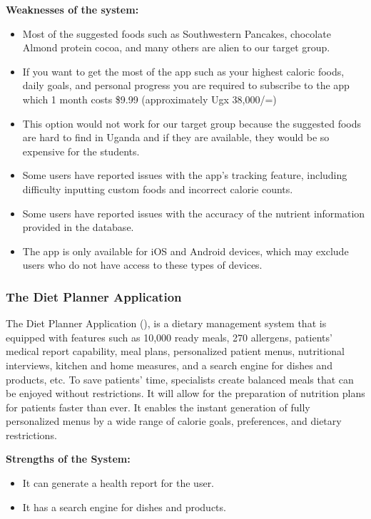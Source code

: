 \documentclass{article}
\begin{document}
\textbf{Weaknesses of the system:}
\begin{itemize}
\item Most of the suggested foods such as Southwestern Pancakes, chocolate Almond protein cocoa, and many others are alien to our target group.
\item If you want to get the most of the app such as your highest caloric foods, daily goals, and personal progress you are required to subscribe to the app which 1 month costs \$9.99 (approximately Ugx 38,000/=)
\item This option would not work for our target group because the suggested foods are hard to find in Uganda and if they are available, they would be so expensive for the students.

\item Some users have reported issues with the app's tracking feature, including difficulty inputting custom foods and incorrect calorie counts.
\item Some users have reported issues with the accuracy of the nutrient information provided in the database.
\item The app is only available for iOS and Android devices, which may exclude users who do not have access to these types of devices.

\end{itemize}

\subsubsection{The Diet Planner Application}

The Diet Planner Application (\cite{dietplannerapp}), is a dietary management system that is equipped with features such as 10,000 ready meals, 270 allergens, patients' medical report capability, meal plans, personalized patient menus, nutritional interviews, kitchen and home measures, and a search engine for dishes and products, etc. To save patients' time, specialists create balanced meals that can be enjoyed without restrictions. It will allow for the preparation of nutrition plans for patients faster than ever. It enables the instant generation of fully personalized menus by a wide range of calorie goals, preferences, and dietary restrictions.

\textbf{Strengths of the System:}
\begin{itemize}
\item It can generate a health report for the user.
\item It has a search engine for dishes and products.
\end{itemize}
\end{document}
